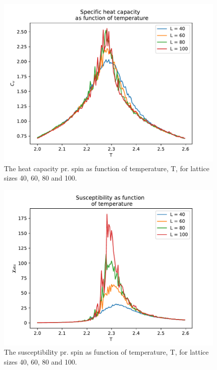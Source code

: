 \documentclass[12pt,english,a4paper]{article}
\newcommand*{\figuretitle}[1]{%
    {\centering%
    \textbf{#1}%
    \par}%
}
\begin{document}
\begin{figure}[H]
    \centering
    \includegraphics[scale=0.7]{Figures/Cv_of_T_mpi_2_2,6.pdf}
    \caption{The heat capacity pr. spin as function of temperature, T, for lattice sizes 40, 60, 80 and 100.}
    \label{fig:Cv_of_T}
\end{figure}
\begin{figure}[H]
    \centering
    \includegraphics[scale=0.7]{Figures/Xabs_of_T_mpi_2_2,6.pdf}
    \caption{The susceptibility pr. spin as function of temperature, T, for lattice sizes 40, 60, 80 and 100.}
    \label{fig:X_of_T}
\end{figure}
\end{document}
